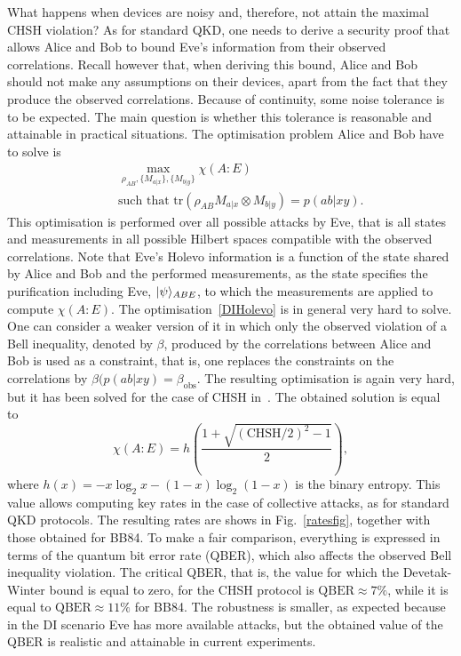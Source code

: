 \documentclass[a4paper]{article}
\def\tr{\mbox{tr}}
\begin{document}
What happens when devices are noisy and, therefore, not attain the maximal CHSH violation? As for standard QKD, one needs to derive a security proof that allows Alice and Bob to bound Eve's information from their observed correlations. Recall however that, when deriving this bound, Alice and Bob should not make any assumptions on their devices, apart from the fact that they produce the observed correlations. Because of continuity, some noise tolerance is to be expected. The main question is whether this tolerance is reasonable and attainable in practical situations. The optimisation problem Alice and Bob have to solve is
\begin{eqnarray}
\label{DIHolevo}
&&\max_{\rho_{AB},\{M_{a|x}\},\{M_{b|y}\}}\chi(A:E)\\
&&\text{such that }\tr(\rho_{AB}M_{a|x}\otimes M_{b|y})=p(ab|xy) .\nonumber
\end{eqnarray}
This optimisation is performed over all possible attacks by Eve, that is all states and measurements in all possible Hilbert spaces compatible with the observed correlations. Note that Eve's Holevo information is a function of the state shared by Alice and Bob and the performed measurements, as the state specifies the purification including Eve, $|\psi\rangle_{ABE}$, to which the measurements are applied to compute $\chi(A:E)$. The optimisation~\eqref{DIHolevo} is in general very hard to solve. One can consider a weaker version of it in which only the observed violation of a Bell inequality, denoted by $\beta$, produced by the correlations between Alice and Bob is used as a constraint, that is, one replaces the constraints on the correlations by $\beta(p(ab|xy)=\beta_{\text{obs}}$. The resulting optimisation is again very hard, but it has been solved for the case of CHSH in~\cite{diqkd}. The obtained solution is equal to 
\begin{equation}
\chi(A:E)=h\left(\frac{1+\sqrt{(\text{CHSH}/2)^2-1}}{2}\right) ,
\end{equation}
where $h(x)=-x\log_2x-(1-x)\log_2(1-x)$ is the binary entropy.  This value allows computing key rates in the case of collective attacks, as for standard QKD protocols. The resulting rates are shows in Fig.~\ref{ratesfig}, together with those obtained for BB84. To make a fair comparison, everything is expressed in terms of the quantum bit error rate (QBER), which also affects the observed Bell inequality violation. The critical QBER, that is, the value for which the Devetak-Winter bound is equal to zero, for the CHSH protocol is $\text{QBER}\approx 7\%$, while it is equal to $\text{QBER}\approx 11\%$ for BB84. The robustness is smaller, as expected because in the DI scenario Eve has more available attacks, but the obtained value of the QBER is realistic and attainable in current experiments.
\end{document}
